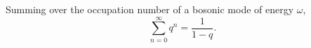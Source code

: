 \documentclass{article}
\begin{document}
Summing over the occupation number of a bosonic mode of energy $\omega$,
\begin{equation}
\sum_{n=0}^{\infty} q^{n} = \frac{1}{1-q} .
\label{eq:g}
\end{equation}
\end{document}
